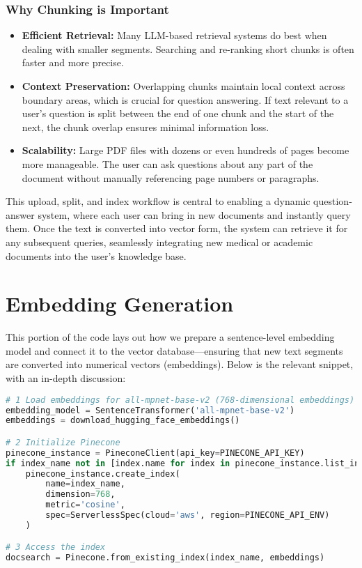 \subsubsection*{Why Chunking is Important}
\begin{itemize}
  \item \textbf{Efficient Retrieval:} Many LLM-based retrieval systems do best when dealing with smaller segments. Searching and re-ranking short chunks is often faster and more precise.
  \item \textbf{Context Preservation:} Overlapping chunks maintain local context across boundary areas, which is crucial for question answering. If text relevant to a user’s question is split between the end of one chunk and the start of the next, the chunk overlap ensures minimal information loss.
  \item \textbf{Scalability:} Large PDF files with dozens or even hundreds of pages become more manageable. The user can ask questions about any part of the document without manually referencing page numbers or paragraphs.
\end{itemize}

This upload, split, and index workflow is central to enabling a dynamic question-answer system, where each user can bring in new documents and instantly query them. Once the text is converted into vector form, the system can retrieve it for any subsequent queries, seamlessly integrating new medical or academic documents into the user’s knowledge base.

\section{Embedding Generation}
\label{sec:embedding-generation}

This portion of the code lays out how we prepare a sentence-level embedding model and connect it to the vector database—ensuring that new text segments are converted into numerical vectors (embeddings). Below is the relevant snippet, with an in-depth discussion:

\begin{lstlisting}[language=Python, caption={Embedding Model Setup and Pinecone Integration}, basicstyle=\small\ttfamily]
# 1 Load embeddings for all-mpnet-base-v2 (768-dimensional embeddings)
embedding_model = SentenceTransformer('all-mpnet-base-v2')
embeddings = download_hugging_face_embeddings()

# 2 Initialize Pinecone
pinecone_instance = PineconeClient(api_key=PINECONE_API_KEY)
if index_name not in [index.name for index in pinecone_instance.list_indexes()]:
    pinecone_instance.create_index(
        name=index_name,
        dimension=768,
        metric='cosine',
        spec=ServerlessSpec(cloud='aws', region=PINECONE_API_ENV)
    )

# 3 Access the index
docsearch = Pinecone.from_existing_index(index_name, embeddings)
\end{lstlisting}

